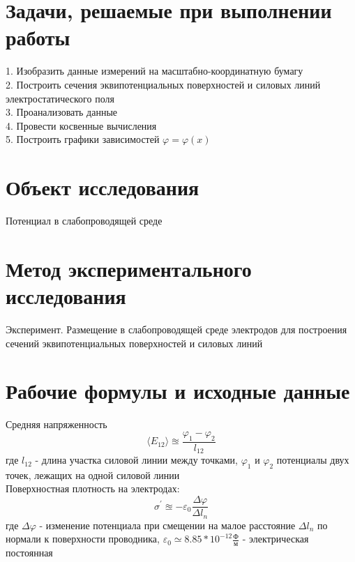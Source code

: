 \documentclass[12pt]{extarticle}
\begin{document}
    \section{Задачи, решаемые при выполнении работы}
    1. Изобразить данные измерений на масштабно-координатную бумагу
    \\2. Построить сечения эквипотенциальных поверхностей и силовых линий электростатического поля
    \\3. Проанализовать данные
    \\4. Провести косвенные вычисления
    \\5. Построить графики зависимостей $\varphi = \varphi(x)$
    
    \section{Объект исследования}
    Потенциал в слабопроводящей среде

    \section{Метод экспериментального исследования}
    Эксперимент. Размещение в слабопроводящей среде электродов для построения сечений эквипотенциальных поверхностей и силовых линий

    \newpage
    \section{Рабочие формулы и исходные данные}
    
    Средняя напряженность
    \begin{equation*}
        \langle E_{12} \rangle \approxeq \frac{\varphi_1 - \varphi_2}{l_{12}}
    \end{equation*}
    где $l_{12}$ - длина участка силовой линии между точками, 
    $\varphi_1$ и $\varphi_2$ потенциалы двух точек, лежащих на одной силовой линии \\
   Поверхностная плотность на электродах: \\
   \begin{equation*}
        \sigma^\prime \approxeq -\varepsilon_0\frac{\Delta\varphi}{\Delta l_n}
   \end{equation*}
   где $\Delta\varphi$ - изменение потенциала при смещении на малое расстояние $\Delta l_n$ по нормали к поверхности проводника, 
   $\varepsilon_0 \simeq 8.85 * 10^{-12} \frac{\text{Ф}}{\text{м}}$ - электрическая постоянная
\end{document}

